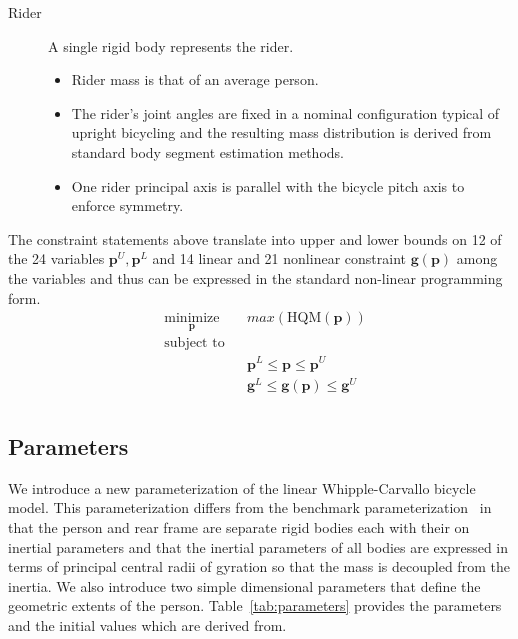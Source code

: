 \documentclass{bmd2019a}
\begin{document}
\begin{description}
  \item[Rider] A single rigid body represents the rider.
    \begin{itemize}
      \itemsep0em
      \item Rider mass is that of an average person.
      \item The rider's joint angles are fixed in a nominal configuration
        typical of upright bicycling and the resulting mass distribution is
        derived from standard body segment estimation methods.
      \item One rider principal axis is parallel with the bicycle pitch axis to
        enforce symmetry.
    \end{itemize}

\end{description}

The constraint statements above translate into upper and lower bounds on 12 of
the 24 variables $\mathbf{p}^U,\mathbf{p}^L$ and 14 linear and 21 nonlinear
constraint $\mathbf{g}(\mathbf{p})$ among the variables and thus can be
expressed in the standard non-linear programming form.
%
\begin{equation}
  \begin{aligned}
    & \underset{\mathbf{p}}{\text{minimize}} & & max(\textrm{HQM}(\mathbf{p})) \\
    & \text{subject to} & & \\
    & & & \mathbf{p}^L \leq \mathbf{p} \leq \mathbf{p}^U \\
    & & & \mathbf{g}^L \leq \mathbf{g}(\mathbf{p}) \leq \mathbf{g}^U \\
  \end{aligned}
\end{equation}

\subsection*{Parameters}
%
We introduce a new parameterization of the linear Whipple-Carvallo bicycle
model. This parameterization differs from the benchmark
parameterization~\cite{Meijaard2007} in that the person and rear frame are
separate rigid bodies each with their on inertial parameters and that the
inertial parameters of all bodies are expressed in terms of principal central
radii of gyration so that the mass is decoupled from the inertia. We also
introduce two simple dimensional parameters that define the geometric extents
of the person. Table~\ref{tab:parameters} provides the parameters and the
initial values which are derived from.
\end{document}
